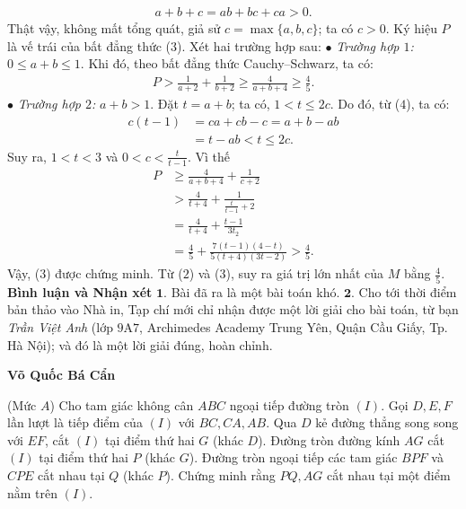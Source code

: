 \begin{multicols}{2}
	\begin{align*}
		a + b + c = ab + bc + ca > 0. \tag{$4$}
	\end{align*}
	Thật vậy, không mất tổng quát, giả sử \linebreak$c = \max\{a,b,c\}$;  ta có $c > 0$.
	\vskip 0.05cm
	Ký hiệu $P$ là vế trái của bất đẳng thức ($3$).
	\vskip 0.05cm
	Xét hai trường hợp sau:
	\vskip 0.05cm
	$\bullet$ \textit{Trường hợp $1$:} $0 \le a + b \le 1$.
	\vskip 0.05cm
	Khi đó, theo bất đẳng thức Cauchy--Schwarz, ta có:
	\begin{align*}
		P > \frac{1}{{a + 2}} + \frac{1}{{b + 2}} \ge \frac{4}{{a + b + 4}} \ge \frac{4}{5}.
	\end{align*}
	$\bullet$ \textit{Trường hợp $2$:} $a + b > 1$.
	\vskip 0.05cm
	Đặt $t = a + b$; ta có, $1 < t \le 2c$. Do đó, từ ($4$), ta có:
	\begin{align*}
		c(t - 1) &= ca + cb - c = a + b - ab \\
		&= t - ab < t \le 2c.
	\end{align*}
	Suy ra, $1 < t < 3$ và $0 < c < \frac{t}{t-1}$.  
	Vì thế
	\begin{align*}
		P &\ge \frac{4}{a + b + 4} + \frac{1}{c + 2}\\
		 &> \frac{4}{t + 4} + \frac{1}{\frac{t}{t-1} + 2}\\
		 &= \frac{4}{t + 4} + \frac{t-1}{3t_2}\\
		 &= \frac{4}{5} + \frac{7(t-1)(4-t)}{5(t+4)(3t-2)}>\frac{4}{5}.
	\end{align*}
	Vậy, ($3$) được chứng minh.
	\vskip 0.05cm
	Từ ($2$) và ($3$), suy ra giá trị lớn nhất của $M$ bằng $\frac{4}{5}$.
	\vskip 0.05cm 
	\textbf{\color{thachthuctoanhoc}Bình luận và Nhận xét}
	\vskip 0.05cm
	$\pmb{1.}$ Bài đã ra là một bài toán khó.
	\vskip 0.05cm
	$\pmb{2.}$ Cho tới thời điểm bản thảo vào Nhà in, Tạp chí mới chỉ nhận được một lời giải cho bài toán, từ bạn \textit{Trần Việt Anh} (lớp $9$A$7$, Archimedes Academy Trung Yên, Quận Cầu Giấy, Tp. Hà Nội); và đó là một lời giải đúng, hoàn chỉnh.
	\begin{flushright}
		\textbf{\color{thachthuctoanhoc}Võ Quốc Bá Cẩn}
	\end{flushright}
	{}
	(Mức $A$) Cho tam giác không cân $ABC$ ngoại tiếp đường tròn $(I)$. Gọi $D,E,F$ lần lượt là tiếp điểm của $(I)$ với $BC,CA,AB$. Qua $D$ kẻ đường thẳng song song với $EF$, cắt $(I)$ tại điểm thứ hai $G$ (khác $D$). Đường tròn đường kính $AG$ cắt $(I)$ tại điểm thứ hai $P$ (khác $G$). Đường tròn ngoại tiếp các tam giác $BPF$ và $CPE$ cắt nhau tại $Q$ (khác $P$). Chứng minh rằng $PQ,AG$ cắt nhau tại một điểm nằm trên $(I)$. 

\end{multicols}
